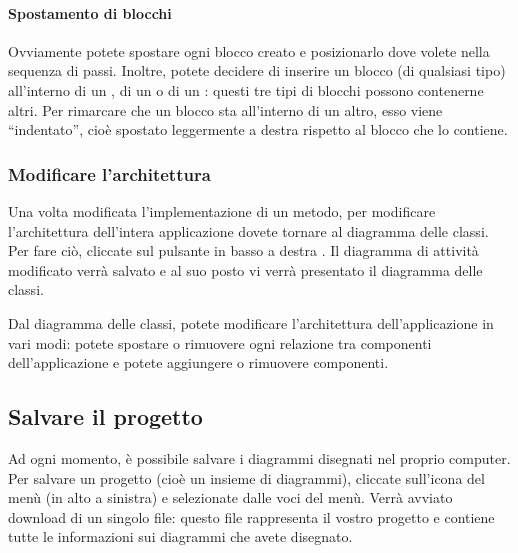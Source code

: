 \paragraph{Spostamento di blocchi} Ovviamente potete spostare ogni blocco creato e posizionarlo dove volete nella sequenza di passi. Inoltre, potete decidere di inserire un blocco (di qualsiasi tipo) all'interno di un , di un  o di un : questi tre tipi di blocchi possono contenerne altri. Per rimarcare che un blocco sta all'interno di un altro, esso viene “indentato”, cioè spostato leggermente a destra rispetto al blocco che lo contiene.


\subsubsection{Modificare l'architettura}
Una volta modificata l'implementazione di un metodo, per modificare l'architettura dell'intera applicazione dovete tornare al diagramma delle classi. Per fare ciò, cliccate sul pulsante in basso a destra . Il diagramma di attività modificato verrà salvato e al suo posto vi verrà presentato il diagramma delle classi.

Dal diagramma delle classi, potete modificare l'architettura dell'applicazione in vari modi: potete spostare o rimuovere ogni relazione tra componenti dell'applicazione e potete aggiungere o rimuovere componenti.



\subsection{Salvare il progetto} \label{sec:save} %

Ad ogni momento, è possibile salvare i diagrammi disegnati nel proprio computer. Per salvare un progetto (cioè un insieme di diagrammi), cliccate sull'icona del menù (in alto a sinistra) e selezionate  dalle voci del menù. Verrà avviato download di un singolo file: questo file rappresenta il vostro progetto e contiene tutte le informazioni sui diagrammi che avete disegnato.



